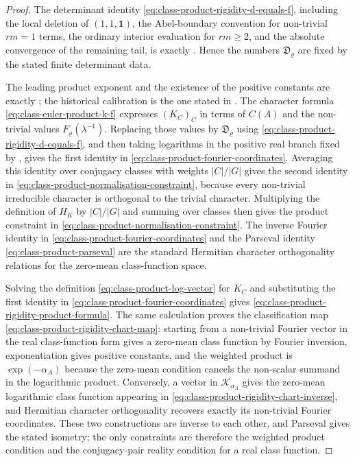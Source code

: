 \documentclass[11pt,a4paper]{amsart}
\theoremstyle{plain}
\theoremstyle{definition}
\theoremstyle{remark}
\begin{document}
\begin{proof}
  The determinant identity
  \eqref{eq:class-product-rigidity-d-equals-f}, including the local deletion
  of \((1,1,\mathbf1)\), the Abel-boundary convention for non-trivial
  \(rm=1\) terms, the ordinary interior evaluation for \(rm\ge2\), and the
  absolute convergence of the remaining tail, is exactly
  .  Hence the numbers
  \(\mathfrak D_\varrho\) are fixed by the stated finite determinant data.

  The leading product exponent and the existence of the positive constants
  are exactly ; the historical
  calibration is the one stated in .
  The character formula \eqref{eq:class-euler-product-k-f} expresses
  \((K_C)_C\) in terms of \(C(A)\) and the non-trivial values
  \(F_\varrho(\lambda^{-1})\).  Replacing those values by
  \(\mathfrak D_\varrho\) using
  \eqref{eq:class-product-rigidity-d-equals-f}, and then taking logarithms in
  the positive real branch fixed by ,
  gives the first identity in \eqref{eq:class-product-fourier-coordinates}.
  Averaging this identity over conjugacy classes with weights \(|C|/|G|\)
  gives the second identity in
  \eqref{eq:class-product-normalisation-constraint}, because every
  non-trivial irreducible character is orthogonal to the trivial character.
  Multiplying the definition of \(H_K\) by \(|C|/|G|\) and summing over
  classes then gives the product constraint in
  \eqref{eq:class-product-normalisation-constraint}.  The inverse Fourier
  identity in \eqref{eq:class-product-fourier-coordinates} and the Parseval
  identity \eqref{eq:class-product-parseval} are the standard Hermitian
  character orthogonality relations for the zero-mean class-function space.

  Solving the definition \eqref{eq:class-product-log-vector} for \(K_C\) and
  substituting the first identity in
  \eqref{eq:class-product-fourier-coordinates} gives
  \eqref{eq:class-product-rigidity-product-formula}.  The same calculation
  proves the classification map
  \eqref{eq:class-product-rigidity-chart-map}: starting from a non-trivial
  Fourier vector in the real class-function form gives a zero-mean class
  function by Fourier inversion, exponentiation gives positive constants, and
  the weighted product is \(\exp(-\alpha_A)\) because the zero-mean condition
  cancels the non-scalar summand in the logarithmic product.  Conversely, a
  vector in \(\mathscr K_{\alpha_A}\) gives the zero-mean logarithmic class
  function appearing in \eqref{eq:class-product-rigidity-chart-inverse}, and
  Hermitian character orthogonality recovers exactly its non-trivial Fourier
  coordinates.  These two constructions are inverse to each other, and
  Parseval gives the stated isometry; the only constraints are therefore the
  weighted product condition and the conjugacy-pair reality condition for a
  real class function.


\end{proof}
\end{document}
